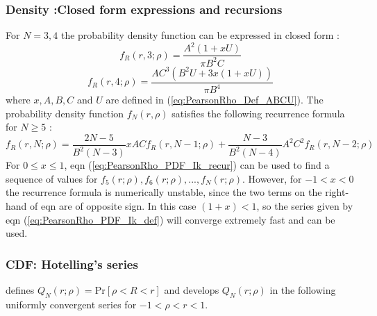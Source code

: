 \subsubsection{Density :Closed form expressions and recursions}
For $N = 3,4$ the probability density function can be expressed in closed form \citep{odeh_1986}:
\begin{equation}  \label{eq:PearsonRho_Closed_f3_density}
	f_R(r, 3; \rho) = \frac{A^2(1+xU)}{\pi B^2C} 
\end{equation}
\begin{equation} \label{eq:PearsonRho_Closed_f4_density}
	f_R(r, 4; \rho) =\frac{AC^3 (B^2U + 3x(1+xU))}{\pi B^4} 
\end{equation}
where $x, A, B, C$ and $U$ are defined in  (\ref{eq:PearsonRho_Def_ABCU}). The probability density function $f_N(r,\rho)$ satisfies the following recurrence formula for $N \geq 5$ \citep{hotelling_1953}:
\begin{equation} \label{eq:PearsonRho_PDF_Ik_recur}
	f_R(r, N; \rho) = \frac{2N-5}{B^2(N-3)} x A C f_R(r, N-1; \rho) + \frac{N-3}{B^2(N-4)} A^2 C^2 f_R(r, N-2; \rho)  
\end{equation}
For $0 \leq x \leq 1$, eqn (\ref{eq:PearsonRho_PDF_Ik_recur}) can be used to find a sequence of values for $f_5(r;\rho), f_6(r;\rho),...,f_{N}(r;\rho)$. However, for $-1 < x < 0$ the recurrence formula is numerically unstable, since the two terms on the right-hand of eqn  are of opposite sign. In this case $(1+x)<1$, so the series given by eqn (\ref{eq:PearsonRho_PDF_Ik_def}) will converge extremely fast and can be used.



\subsubsection{CDF: Hotelling's series}
\label{rhoDistributionCDF}
\citet{hotelling_1953}  defines $Q_N(r;\rho) = \text{Pr}[\rho<R<r]$ and develops  $Q_N(r;\rho)$ in the following uniformly convergent series for $-1<\rho<r<1$. 

